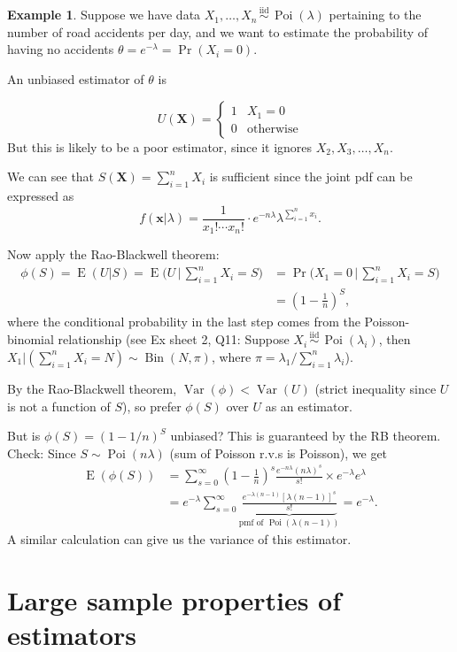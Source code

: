 \documentclass[
]{book}
\newcommand{\bx}{{\boldsymbol x}}
\newcommand{\bX}{{\boldsymbol X}}
\DeclareMathOperator{\E}{E}
\DeclareMathOperator{\Var}{Var}
\DeclareMathOperator{\Bin}{Bin}
\DeclareMathOperator{\Pois}{Poi}
\newcommand{\iid}{\,\overset{\text{iid}}{\sim}\,}
\theoremstyle{definition}
\theoremstyle{definition}
\newtheorem{example}{Example}[chapter]
\theoremstyle{definition}
\theoremstyle{definition}
\theoremstyle{remark}
\begin{document}
\begin{example}
Suppose we have data \(X_1,\dots,X_n\iid\Pois(\lambda)\) pertaining to the number of road accidents per day, and we want to estimate the probability of having no accidents \(\theta = e^{-\lambda}=\Pr(X_i=0)\).

An unbiased estimator of \(\theta\) is

\[
U(\bX) = \begin{cases}
1 & X_1 =0 \\
0 & \text{otherwise}
\end{cases}
\]
But this is likely to be a poor estimator, since it ignores \(X_2,X_3,\dots,X_n\).

We can see that \(S(\bX)=\sum_{i=1}^n X_i\) is sufficient since the joint pdf can be expressed as
\[
f(\bx|\lambda) = \frac{1}{x_1!\cdots x_n!} \cdot e^{-n\lambda}\lambda^{\sum_{i=1}^nx_i}.
\]

Now apply the Rao-Blackwell theorem:
\begin{align*}
\phi(S) = \E(U|S) = \E\Big(U \, \Big| \, \sum_{i=1}^n X_i = S  \Big) 
&= \Pr\Big(X_1=0  \, \Big| \, \sum_{i=1}^n X_i = S  \Big)\\
&= \left(1 - \frac{1}{n} \right)^S,
\end{align*}
where the conditional probability in the last step comes from the Poisson-binomial relationship (see Ex sheet 2, Q11: Suppose \(X_i\iid\Pois(\lambda_i)\), then \(X_1\big|(\sum_{i=1}^nX_i=N)\sim\Bin(N,\pi)\), where \(\pi=\lambda_1/\sum_{i=1}^n \lambda_i\)).

By the Rao-Blackwell theorem, \(\Var(\phi)<\Var(U)\) (strict inequality since \(U\) is not a function of \(S\)), so prefer \(\phi(S)\) over \(U\) as an estimator.

But is \(\phi(S)=(1-1/n)^S\) unbiased? This is guaranteed by the RB theorem. Check: Since \(S\sim\Pois(n\lambda)\) (sum of Poisson r.v.s is Poisson), we get
\begin{align*}
\E(\phi(S)) &= \sum_{s=0}^\infty \left(1 - \frac{1}{n} \right)^s  \frac{e^{-n\lambda}(n\lambda)^s}{s!}\times e^{-\lambda}e^{\lambda} \\
&= e^{-\lambda} \sum_{s=0}^\infty \underbrace{\frac{e^{-\lambda(n-1)}[\lambda(n-1)]^s}{s!}}_{\text{pmf of }\Pois(\lambda(n-1))} = e^{-\lambda}.
\end{align*}
A similar calculation can give us the variance of this estimator.
\end{example}

\hypertarget{large-sample-properties-of-estimators}{%
\section{Large sample properties of estimators}\label{large-sample-properties-of-estimators}}
\end{document}

